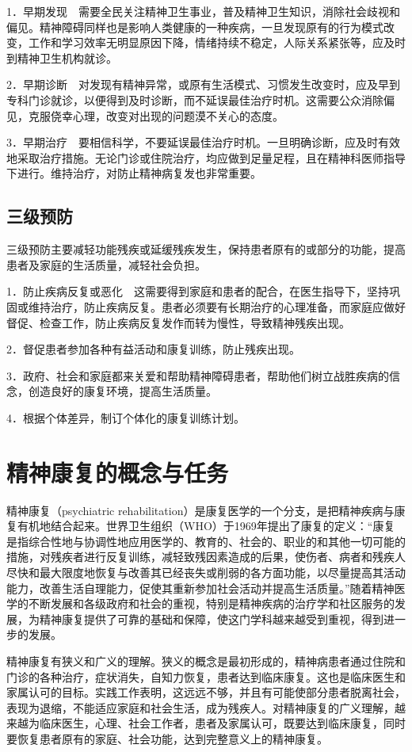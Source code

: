 1．早期发现　需要全民关注精神卫生事业，普及精神卫生知识，消除社会歧视和偏见。精神障碍同样也是影响人类健康的一种疾病，一旦发现原有的行为模式改变，工作和学习效率无明显原因下降，情绪持续不稳定，人际关系紧张等，应及时到精神卫生机构就诊。

2．早期诊断　对发现有精神异常，或原有生活模式、习惯发生改变时，应及早到专科门诊就诊，以便得到及时诊断，而不延误最佳治疗时机。这需要公众消除偏见，克服侥幸心理，改变对出现的问题漠不关心的态度。

3．早期治疗　要相信科学，不要延误最佳治疗时机。一旦明确诊断，应及时有效地采取治疗措施。无论门诊或住院治疗，均应做到足量足程，且在精神科医师指导下进行。维持治疗，对防止精神病复发也非常重要。

\subsection{三级预防}

三级预防主要减轻功能残疾或延缓残疾发生，保持患者原有的或部分的功能，提高患者及家庭的生活质量，减轻社会负担。

1．防止疾病反复或恶化　这需要得到家庭和患者的配合，在医生指导下，坚持巩固或维持治疗，防止疾病反复。患者必须要有长期治疗的心理准备，而家庭应做好督促、检查工作，防止疾病反复发作而转为慢性，导致精神残疾出现。

2．督促患者参加各种有益活动和康复训练，防止残疾出现。

3．政府、社会和家庭都来关爱和帮助精神障碍患者，帮助他们树立战胜疾病的信念，创造良好的康复环境，提高生活质量。

4．根据个体差异，制订个体化的康复训练计划。

\section{精神康复的概念与任务}

精神康复（psychiatric
rehabilitation）是康复医学的一个分支，是把精神疾病与康复有机地结合起来。世界卫生组织（WHO）于1969年提出了康复的定义：“康复是指综合性地与协调性地应用医学的、教育的、社会的、职业的和其他一切可能的措施，对残疾者进行反复训练，减轻致残因素造成的后果，使伤者、病者和残疾人尽快和最大限度地恢复与改善其已经丧失或削弱的各方面功能，以尽量提高其活动能力，改善生活自理能力，促使其重新参加社会活动并提高生活质量。”随着精神医学的不断发展和各级政府和社会的重视，特别是精神疾病的治疗学和社区服务的发展，为精神康复提供了可靠的基础和保障，使这门学科越来越受到重视，得到进一步的发展。

精神康复有狭义和广义的理解。狭义的概念是最初形成的，精神病患者通过住院和门诊的各种治疗，症状消失，自知力恢复，患者达到临床康复。这也是临床医生和家属认可的目标。实践工作表明，这远远不够，并且有可能使部分患者脱离社会，表现为退缩，不能适应家庭和社会生活，成为残疾人。对精神康复的广义理解，越来越为临床医生，心理、社会工作者，患者及家属认可，既要达到临床康复，同时要恢复患者原有的家庭、社会功能，达到完整意义上的精神康复。


